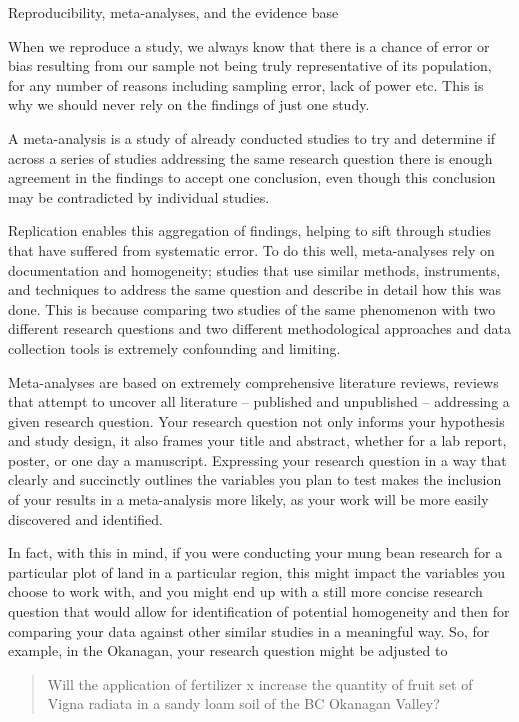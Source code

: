 \documentclass[
]{book}
\begin{document}
Reproducibility, meta-analyses, and the evidence base

When we reproduce a study, we always know that there is a chance of error or bias resulting from our sample not being truly representative of its population, for any number of reasons including sampling error, lack of power etc. This is why we should never rely on the findings of just one study.

A meta-analysis is a study of already conducted studies to try and determine if across a series of studies addressing the same research question there is enough agreement in the findings to accept one conclusion, even though this conclusion may be contradicted by individual studies.

Replication enables this aggregation of findings, helping to sift through studies that have suffered from systematic error. To do this well, meta-analyses rely on documentation and homogeneity; studies that use similar methods, instruments, and techniques to address the same question and describe in detail how this was done. This is because comparing two studies of the same phenomenon with two different research questions and two different methodological approaches and data collection tools is extremely confounding and limiting.

Meta-analyses are based on extremely comprehensive literature reviews, reviews that attempt to uncover all literature -- published and unpublished -- addressing a given research question. Your research question not only informs your hypothesis and study design, it also frames your title and abstract, whether for a lab report, poster, or one day a manuscript. Expressing your research question in a way that clearly and succinctly outlines the variables you plan to test makes the inclusion of your results in a meta-analysis more likely, as your work will be more easily discovered and identified.

In fact, with this in mind, if you were conducting your mung bean research for a particular plot of land in a particular region, this might impact the variables you choose to work with, and you might end up with a still more concise research question that would allow for identification of potential homogeneity and then for comparing your data against other similar studies in a meaningful way. So, for example, in the Okanagan, your research question might be adjusted to

\begin{quote}
Will the application of fertilizer x increase the quantity of fruit set of Vigna radiata in a sandy loam soil of the BC Okanagan Valley?
\end{quote}
\end{document}
